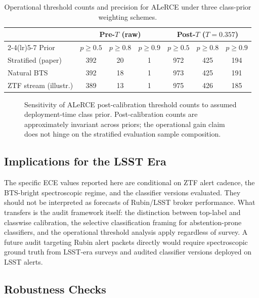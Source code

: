 \documentclass[twocolumn]{aastex631}
\begin{document}
\begin{table}[t]
\centering
\caption{Operational threshold counts and precision for ALeRCE
under three class-prior weighting schemes.
\label{tab:prior_sensitivity}}
\begin{tabular}{lcccccc}
\toprule
 & \multicolumn{3}{c}{Pre-$T$ (raw)} & \multicolumn{3}{c}{Post-$T$ ($T = 0.357$)} \\
\cmidrule(lr){2-4}\cmidrule(lr){5-7}
Prior & $p \geq 0.5$ & $p \geq 0.8$ & $p \geq 0.9$
& $p \geq 0.5$ & $p \geq 0.8$ & $p \geq 0.9$ \\
\midrule
Stratified (paper) & 392 & 20 & 1 & 972 & 425 & 194 \\
Natural BTS        & 392 & 18 & 1 & 973 & 425 & 191 \\
ZTF stream (illustr.) & 389 & 13 & 1 & 975 & 426 & 185 \\
\bottomrule
\end{tabular}
\end{table}

\begin{figure}[!b]
\caption{Sensitivity of ALeRCE post-calibration threshold counts
to assumed deployment-time class prior. Post-calibration counts
are approximately invariant across priors; the operational gain
claim does not hinge on the stratified evaluation sample
composition. \label{fig:prior_sensitivity}}
\end{figure}

\subsection{Implications for the LSST Era}\label{sec:disc_lsst}

The specific ECE values reported here are conditional on ZTF
alert cadence, the BTS-bright spectroscopic regime, and the
classifier versions evaluated. They should not be interpreted as
forecasts of Rubin/LSST broker performance. What transfers is the
audit framework itself: the distinction between top-label and
classwise calibration, the selective classification framing for
abstention-prone classifiers, and the operational threshold
analysis apply regardless of survey. A future audit targeting
Rubin alert packets directly would require spectroscopic ground
truth from LSST-era surveys and audited classifier versions
deployed on LSST alerts.

\subsection{Robustness Checks} \label{sec:robustness}
\end{document}
